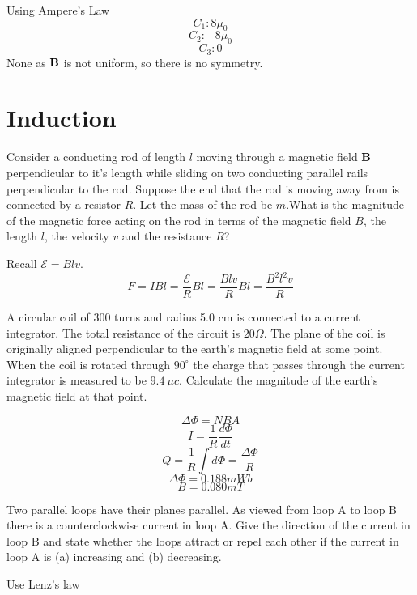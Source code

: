 \begin{questions}
  \begin{solution}
    Using Ampere's Law
    $$C_1: 8 \mu_0$$
    $$C_2: -8 \mu_0$$
    $$C_3: 0$$
    None as ${\bf B}$ is not uniform, so there is no symmetry.
  \end{solution}

  \section{Induction}

  \question[2] Consider a conducting rod of length
  $l$ moving through a magnetic field ${\bf B}$ perpendicular to it's
  length while sliding on two conducting parallel rails perpendicular
  to the rod. Suppose the end that the rod is moving away from is
  connected by a resistor $R$. Let the mass of the rod be $m$.What is
  the magnitude of the magnetic force acting on the rod in terms of
  the magnetic field $B$, the length $l$, the velocity $v$ and the
  resistance $R$?
  \begin{solution}
    Recall $\mathcal{E} = Blv$.
    $$F = IBl = \frac{\mathcal{E}}{R} Bl = \frac{Blv}{R}Bl = \frac{B^2l^2v}{R}$$
  \end{solution}
  
  \question[2] A circular coil of 300 turns and radius 5.0 cm is
  connected to a current integrator. The total resistance of the
  circuit is $20 \Omega$. The plane of the coil is originally aligned
  perpendicular to the earth's magnetic field at some point. When the
  coil is rotated through $90^\circ$ the charge that passes through
  the current integrator is measured to be $9.4\ \mu c$. Calculate the
  magnitude of the earth's magnetic field at that point.

  \begin{solution}
    $$\Delta \Phi = NBA$$
    $$I = \frac{1}{R} \frac{d\Phi}{dt}$$
    $$Q = \frac{1}{R} \int d\Phi = \frac{\Delta \Phi}{R}$$
    $$\Delta \Phi = 0.188 mWb$$
    $$B = 0.080 mT$$
  \end{solution}
  
  \question[2] Two parallel loops have their planes parallel. As
  viewed from loop A to loop B there is a counterclockwise current in
  loop A. Give the direction of the current in loop B and state
  whether the loops attract or repel each other if the current in loop
  A is (a) increasing and (b) decreasing.

  \begin{solution}
    Use Lenz's law
  \end{solution}
  


\end{questions}
